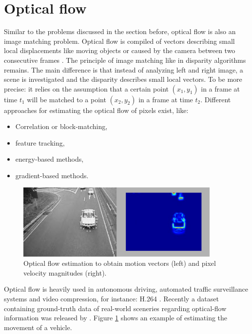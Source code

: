 \section{Optical flow}

Similar to the problems discussed in the section before, optical flow is also an image matching problem.
Optical flow is compiled of vectors describing small local displacements like moving objects or caused by the camera between two consecutive frames \citep{cyganek2011introduction, opencv_library}.
The principle of image matching like in disparity algorithms remains.
The main difference is that instead of analyzing left and right image, a scene is investigated and the disparity describes small local vectors.
To be more precise: it relies on the assumption that a certain point $(x_1, y_1)$ in a frame at time $t_1$ will be matched to a point $(x_2, y_2)$ in a frame at time $t_2$.
Different approaches for estimating the optical flow of pixels exist, like:

\begin{itemize}
  \item Correlation or block-matching,
  \item feature tracking,
  \item energy-based methods,
  \item gradient-based methods.
\end{itemize}

\begin{figure}[h!]
  \centering
  \includegraphics[width=0.9\textwidth]{src/images/optical-flow-estimation.jpg}
  \caption[Optical flow estimation]{Optical flow estimation to obtain motion vectors (left) and pixel velocity magnitudes (right).\protect\footnotemark}
  \label{fig:optical-flow-estimation}
\end{figure}

\noindent Optical flow is heavily used in autonomous driving, automated traffic surveillance systems and video compression, for instance: H.264 \citep{cohen1999detecting, richardson2004h, kondermann2015stereo, menze2015object}.
Recently a dataset containing ground-truth data of real-world sceneries regarding optical-flow information was released by \citeauthor{kondermann2015stereo}.
Figure \ref{fig:optical-flow-estimation} shows an example of estimating the movement of a vehicle.

